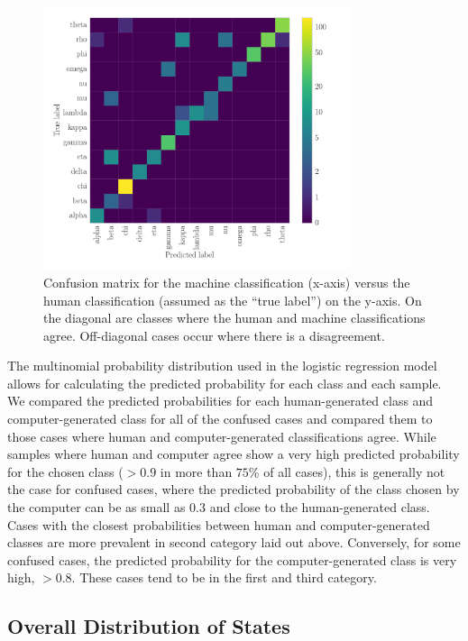 \documentclass[12pt]{emulateapj}
\begin{document}
\begin{figure}[htbp]
\begin{center}
\includegraphics[width=9cm]{grs1915_supervised_cm.pdf}
\caption{Confusion matrix for the machine classification (x-axis) versus the human classification (assumed as the ``true label'') on the 
y-axis. On the diagonal are classes where the human and machine classifications agree. Off-diagonal cases occur where there is a 
disagreement.} 
\label{fig:confusion_matrix}
\end{center}
\end{figure}

The multinomial probability distribution used in the logistic regression model allows for calculating the predicted probability for each class and each sample. We compared the predicted probabilities for each human-generated class and computer-generated class for all of the confused cases and compared them to those cases where human and computer-generated classifications agree. While samples where human and computer agree show a very high predicted probability for the chosen class ($>0.9$ in more than $75\%$ of all cases), this is generally not the case for confused cases, where the predicted probability of the class chosen by the computer can be as small as $0.3$ and close to the human-generated class. Cases with the closest probabilities between human and computer-generated classes 
are more prevalent in second category laid out above. Conversely, for some confused cases, the predicted probability for the computer-generated class is very high, $>0.8$. These cases tend to be in the first and third category. 
 
\subsection{Overall Distribution of States}
\end{document}

